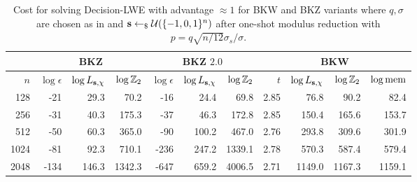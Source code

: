 \begin{table}
\centering{}
\begin{tabular}{|r||r|r|r||r|r|r||r|r|r|r|}
\hline
    & \multicolumn{3}{|c||}{BKZ \cite{LindnerP10}} & \multicolumn{3}{|c||}{BKZ $2.0$ \cite{liu-nguyen:ctrsa2013}} & \multicolumn{4}{|c|}{BKW \cite{albrecht-cid-faugere-fitzpatrick-perret:dcc2013}}\\
\hline
$n$ & $\log \epsilon$ & $\log L_{\mathbf{s},\chi}$ & $\log \mathbb{Z}_2$ & $\log \epsilon$ & $\log L_{\mathbf{s},\chi}$ & $\log \mathbb{Z}_2$ & $t$ &  $\log L_{\mathbf{s},\chi}$ & $\log \mathbb{Z}_2$ & $\log \textnormal{mem}$\\
\hline
  128 &    -21 &     29.3 &     70.2 &    -16 &     24.4 &     69.8 &  2.85 &     76.8 &     90.2 &     82.4 \\
  256 &    -31 &     40.3 &    175.3 &    -37 &     46.3 &    172.8 &  2.85 &    150.4 &    165.6 &    153.7 \\
  512 &    -50 &     60.3 &    365.0 &    -90 &    100.2 &    467.0 &  2.76 &    293.8 &    309.6 &    301.9 \\
 1024 &    -81 &     92.3 &    710.1 &   -236 &    247.2 &   1339.1 &  2.78 &    570.3 &    587.4 &    579.4 \\
 2048 &   -134 &    146.3 &   1342.3 &   -647 &    659.2 &   4006.5 &  2.71 &   1149.0 &   1167.3 &   1159.1 \\
\hline
\end{tabular}
\caption{Cost for solving Decision-LWE with advantage $\approx 1$ for BKW and BKZ variants where $q,\sigma$ are chosen as in \cite{regev:acm09} and 
$\mathbf{s} \leftarrow_{\$} \mathcal{U}(\{-1,0,1\}^n)$ after one-shot modulus reduction with $p = q\sqrt{n/12}\sigma_s/\sigma$.}
\label{tab:modred2}
\end{table}


